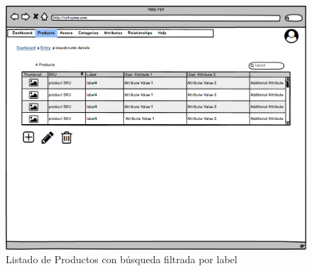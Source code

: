 \begin{figure}[H]
    \includegraphics[width=1\linewidth]{mockups/RF2- Gestión General de Productos (listado por búsqueda).png}
    \caption{Listado de Productos con búsqueda filtrada por label}
   \end{figure}
\vspace{1.0cm}

\newpage %